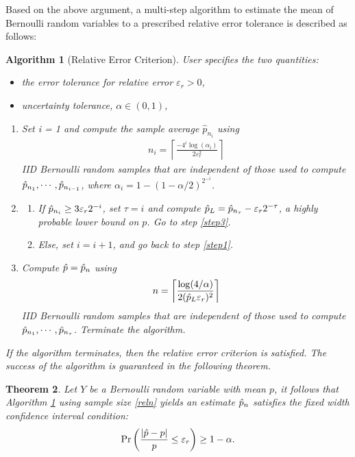 \documentclass{iitthesis}
\newtheorem{theorem}{Theorem}[section]
\newtheorem{algorithm}[theorem]{Algorithm}
\begin{document}
Based on the above argument, a multi-step algorithm to estimate the mean of Bernoulli random variables to a prescribed relative error tolerance is described as follows:
\begin{algorithm}[Relative Error Criterion]\label{algrel}
User specifies the two quantities:
\begin{itemize}
\item the error tolerance for relative error $\varepsilon_r > 0$, 
\item uncertainty tolerance, $\alpha \in (0,1)$, 
\end{itemize}
\begin{enumerate}
\item \label{step1}  Set i = 1 and compute the sample average $\hat{p}_{n_i}$ using 
\begin{align}\label{relalgni}
n_i = \left \lceil \frac{-4^i \log\left ( \alpha_i \right)}{2\varepsilon_r^2}\right \rceil
\end{align}
 IID Bernoulli random samples that are independent of those used to compute
$\hat{p}_{n_1},\cdots,\hat{p}_{n_{i-1}}$, where $\alpha_i=1-(1-\alpha/2)^{2^{-i}}$.
\item \label{step2}
\begin{enumerate}
\item If $\hat{p}_{n_i} \geq 3\varepsilon_r 2^{-i}$, set $\tau=i$ and compute $\hat{p}_L= \hat{p}_{n_\tau} - \varepsilon_r 2^{-\tau}$, a highly probable lower bound on $p$. Go to step \eqref{step3}. 
\item Else, set $i = i+1$, and go back to step \eqref{step1}.
\end{enumerate}
    \item \label{step3}
Compute $\hat{p} = \hat{p}_n$ using 
\begin{align}\label{reln}
n= \left \lceil \frac{\log (4/\alpha)}{2(\hat{p}_L\varepsilon_{r})^2} \right \rceil 
\end{align}
  IID Bernoulli random samples that are independent of those used to compute $\hat{p}_{n_1}, \cdots, \hat{p}_{n_\tau}$. Terminate the algorithm.
  \end{enumerate}
If the algorithm terminates, then the relative error criterion is satisfied. The success of the algorithm is guaranteed in the following theorem.
\end{algorithm}
\begin{theorem}
Let $Y$ be a Bernoulli random variable with mean $p$, it follows that Algorithm \ref{algrel} using sample size \eqref{reln} yields an estimate $\hat{p}_n$ satisfies the fixed width confidence interval condition:
\begin{align}\label{probrel}
\Pr\left(\frac{|\hat{p} -p|}{p} \leq \varepsilon_r \right) \geq 1-\alpha.
\end{align}
\end{theorem}
\end{document}
